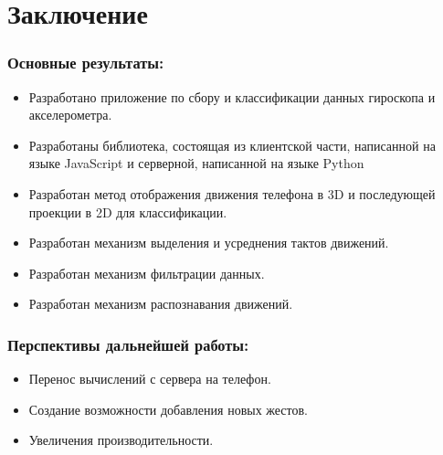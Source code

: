 \section{Заключение}
\subsubsection{Основные результаты:}
\begin{itemize}
    \item Разработано приложение по сбору и классификации данных гироскопа и акселерометра.
    \item Разработаны библиотека, состоящая из клиентской части, написанной на языке JavaScript и серверной, написанной на языке Python
    \item Разработан метод отображения движения телефона в 3D и последующей проекции в 2D для классификации.
    \item Разработан механизм выделения и усреднения тактов движений.
    \item Разработан механизм фильтрации данных.
    \item Разработан механизм распознавания движений.
\end{itemize}

\subsubsection{Перспективы дальнейшей работы:}
\begin{itemize}
    \item Перенос вычислений с сервера на телефон.
    \item Создание возможности добавления новых жестов.
    \item Увеличения производительности.
\end{itemize}